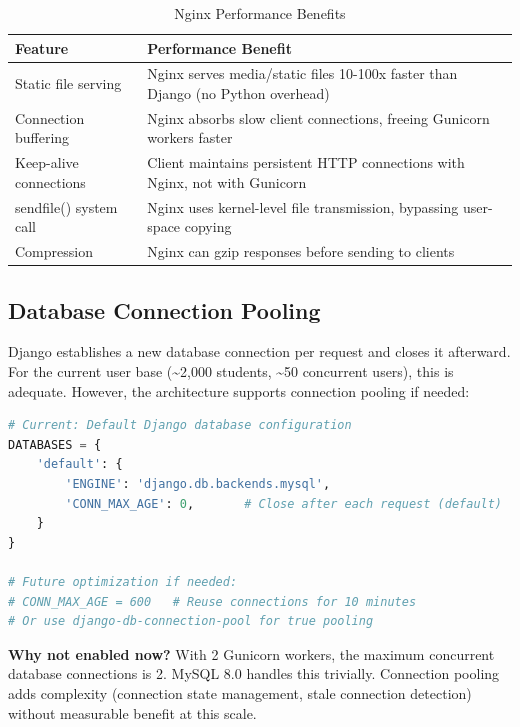 \begin{table}[H]
    \centering
    \renewcommand{\arraystretch}{1.3}
    \begin{tabular}{|l|p{10cm}|}
        \hline
        \textbf{Feature} & \textbf{Performance Benefit} \\
        \hline
        Static file serving & Nginx serves media/static files 10-100x faster than Django (no Python overhead) \\
        \hline
        Connection buffering & Nginx absorbs slow client connections, freeing Gunicorn workers faster \\
        \hline
        Keep-alive connections & Client maintains persistent HTTP connections with Nginx, not with Gunicorn \\
        \hline
        sendfile() system call & Nginx uses kernel-level file transmission, bypassing user-space copying \\
        \hline
        Compression & Nginx can gzip responses before sending to clients \\
        \hline
    \end{tabular}
    \caption{Nginx Performance Benefits}
    \label{tab:nginx-benefits}
\end{table}

\subsection{Database Connection Pooling}

Django establishes a new database connection per request and closes it afterward. For the current user base (\textasciitilde2,000 students, \textasciitilde50 concurrent users), this is adequate. However, the architecture supports connection pooling if needed:

\begin{lstlisting}[language=Python, caption=Current vs. Future Database Configuration]
# Current: Default Django database configuration
DATABASES = {
    'default': {
        'ENGINE': 'django.db.backends.mysql',
        'CONN_MAX_AGE': 0,       # Close after each request (default)
    }
}

# Future optimization if needed:
# CONN_MAX_AGE = 600   # Reuse connections for 10 minutes
# Or use django-db-connection-pool for true pooling
\end{lstlisting}

\textbf{Why not enabled now?} With 2 Gunicorn workers, the maximum concurrent database connections is 2. MySQL 8.0 handles this trivially. Connection pooling adds complexity (connection state management, stale connection detection) without measurable benefit at this scale.

